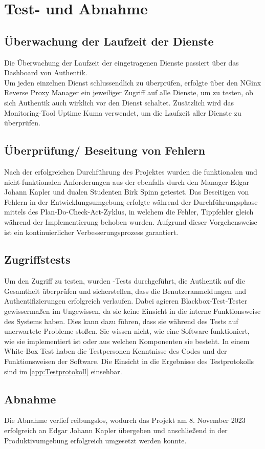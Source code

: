 \section{Test- und Abnahme}
\label{sec:Testphase}

\subsection{Überwachung der Laufzeit der Dienste}
\label{sec:Überwachung der Laufzeit der Dienste}
Die Überwachung der Laufzeit der eingetragenen Dienste passiert über das Dashboard von Authentik.
\\Um jeden einzelnen Dienst schlussendlich zu überprüfen, erfolgte über den NGinx Reverse Proxy Manager ein jeweiliger Zugriff auf alle Dienste, um 
zu testen, ob sich Authentik auch wirklich vor den Dienst schaltet. Zusätzlich wird das Monitoring-Tool Uptime Kuma verwendet, um die 
Laufzeit aller Dienste zu überprüfen.

\subsection{Überprüfung/ Beseitung von Fehlern}
\label{sec:Überprüfung/ Beseitung von Fehlern}
Nach der erfolgreichen Durchführung des Projektes wurden die funktionalen und nicht-funktionalen Anforderungen aus der 
 ebenfalls durch den Manager Edgar Johann Kapler und dualen Studenten Birk Spinn getestet. 
Das Beseitigen von Fehlern in der Entwicklungsumgebung erfolgte während der Durchführungsphase 
mittels des Plan-Do-Check-Act-Zyklus, in welchem die Fehler, \zB Tippfehler gleich während der Implementierung behoben wurden.
Aufgrund dieser Vorgehensweise ist ein kontinuierlicher Verbesserungsprozess garantiert.


\subsection{Zugriffstests}
\label{sec:Zugriffstests}
Um den Zugriff zu testen, wurden \cite{BoxTests}-Tests durchgeführt, die Authentik auf die Gesamtheit überprüfen und 
sicherstellen, dass die Benutzeranmeldungen und Authentifizierungen erfolgreich verlaufen. Dabei agieren 
Blackbox-Test-Tester gewissermaßen im Ungewissen, da sie keine Einsicht in die interne Funktionsweise des Systems haben. 
Dies kann dazu führen, dass sie während des Tests auf unerwartete Probleme stoßen. Sie wissen nicht, wie eine Software 
funktioniert, wie sie implementiert ist oder aus welchen Komponenten sie besteht. In einem White-Box Test haben die 
Testpersonen Kenntnisse des Codes und der Funktionsweisen der Software. Die Einsicht in die Ergebnisse des 
Testprotokolls sind im  \ref{app:Testprotokoll}  einsehbar.

\subsection{Abnahme}
\label{sec:Abnahme}

Die Abnahme verlief reibungslos, wodurch das Projekt am 8. November 2023 erfolgreich an Edgar Johann 
Kapler übergeben und anschließend in der Produktivumgebung erfolgreich umgesetzt werden konnte.